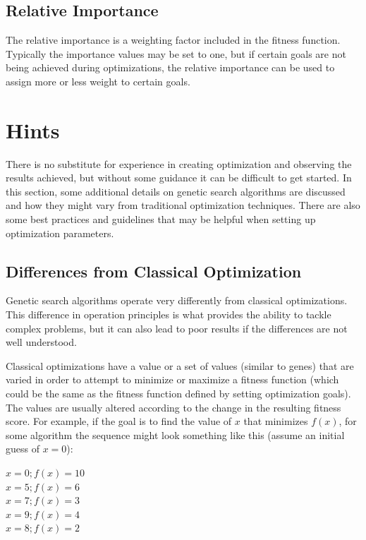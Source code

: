 \subsection{Relative Importance} \label{ssec:goalsRelativeImportance}

The relative importance is a weighting factor included in the fitness function.  Typically the importance values may be set to one, but if certain goals are not being achieved during optimizations, the relative importance can be used to assign more or less weight to certain goals.

\section{Hints} \label{sec:hints}

There is no substitute for experience in creating optimization and observing the results achieved, but without some guidance it can be difficult to get started.  In this section, some additional details on genetic search algorithms are discussed and how they might vary from traditional optimization techniques.  There are also some best practices and guidelines that may be helpful when setting up optimization parameters.

\subsection{Differences from Classical Optimization} \label{ssec:differences}

Genetic search algorithms operate very differently from classical optimizations.  This difference in operation principles is what provides the ability to tackle complex problems, but it can also lead to poor results if the differences are not well understood.

Classical optimizations have a value or a set of values (similar to genes) that are varied in order to attempt to minimize or maximize a fitness function (which could be the same as the fitness function defined by setting optimization goals).  The values are usually altered according to the change in the resulting fitness score.  For example, if the goal is to find the value of $x$ that minimizes $f \left( x \right)$, for some algorithm the sequence might look something like this (assume an initial guess of $x=0$):

\begin{center}
  $x = 0; f \left( x \right) = 10$\\
  $x = 5; f \left( x \right) = 6$\\
  $x = 7; f \left( x \right) = 3$\\
  $x = 9; f \left( x \right) = 4$\\
  $x = 8; f \left( x \right) = 2$
\end{center}

